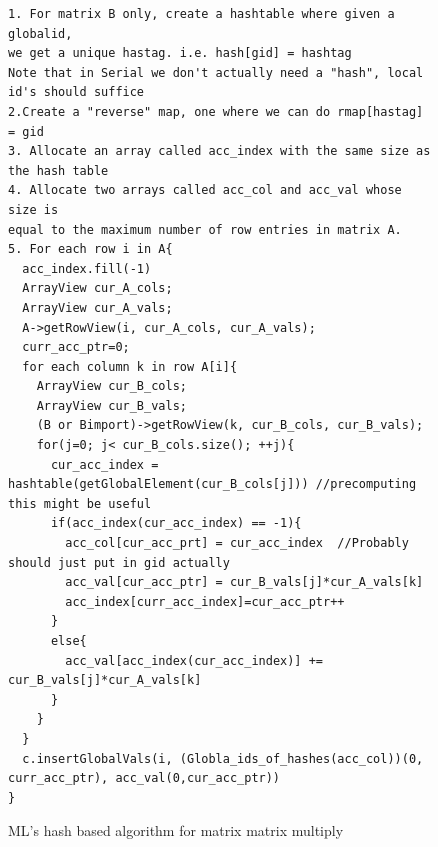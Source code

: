 \documentclass{article}
\begin{document}
\begin{figure}
\centering
{\footnotesize
\begin{verbatim}
1. For matrix B only, create a hashtable where given a globalid, 
we get a unique hastag. i.e. hash[gid] = hashtag
Note that in Serial we don't actually need a "hash", local id's should suffice
2.Create a "reverse" map, one where we can do rmap[hastag] = gid
3. Allocate an array called acc_index with the same size as the hash table
4. Allocate two arrays called acc_col and acc_val whose size is 
equal to the maximum number of row entries in matrix A.
5. For each row i in A{
  acc_index.fill(-1)
  ArrayView cur_A_cols;
  ArrayView cur_A_vals;
  A->getRowView(i, cur_A_cols, cur_A_vals);
  curr_acc_ptr=0;
  for each column k in row A[i]{
    ArrayView cur_B_cols;
    ArrayView cur_B_vals;
    (B or Bimport)->getRowView(k, cur_B_cols, cur_B_vals);
    for(j=0; j< cur_B_cols.size(); ++j){
      cur_acc_index = hashtable(getGlobalElement(cur_B_cols[j])) //precomputing this might be useful
      if(acc_index(cur_acc_index) == -1){
        acc_col[cur_acc_prt] = cur_acc_index  //Probably should just put in gid actually
        acc_val[cur_acc_ptr] = cur_B_vals[j]*cur_A_vals[k]
        acc_index[curr_acc_index]=cur_acc_ptr++
      }
      else{
        acc_val[acc_index(cur_acc_index)] += cur_B_vals[j]*cur_A_vals[k]
      }
    }
  }
  c.insertGlobalVals(i, (Globla_ids_of_hashes(acc_col))(0, curr_acc_ptr), acc_val(0,cur_acc_ptr))
}

\end{verbatim}
}
\caption[Hash based algorithm]{ML's hash based algorithm for matrix matrix multiply}
\label{hashalgo}
\end{figure}
\end{document}
